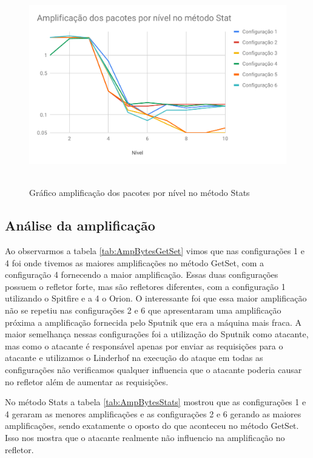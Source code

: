 \begin{figure}[H]
     \centering
     \includegraphics[scale=0.7]{img/AmppacStats.pdf}\
     \caption{Gráfico amplificação dos pacotes por nível no método Stats}
\end{figure}

\subsection{Análise da amplificação}

Ao observarmos a tabela \ref{tab:AmpBytesGetSet} vimos que nas configurações 1 e 4 foi onde tivemos as maiores amplificações no método GetSet, com a configuração 4 fornecendo a maior amplificação. Essas duas configurações possuem o refletor forte, mas são refletores diferentes, com a configuração 1 utilizando o Spitfire e a 4 o Orion. O interessante foi que essa maior amplificação não se repetiu nas configurações 2 e 6 que apresentaram uma amplificação próxima a amplificação fornecida pelo Sputnik que era a máquina mais fraca. A maior semelhança nessas configurações foi a utilização do Sputnik como atacante, mas como o atacante é responsável apenas por enviar as requisições para o atacante e utilizamos o Linderhof na execução do ataque em todas as configurações não verificamos qualquer influencia que o atacante poderia causar no refletor além de aumentar as requisições.

No método Stats a tabela \ref{tab:AmpBytesStats} mostrou que as configurações 1 e 4 geraram as menores amplificações e as configurações 2 e 6 gerando as maiores amplificações, sendo exatamente o oposto do que aconteceu no método GetSet. Isso nos mostra que o atacante realmente não influencio na amplificação no refletor.

